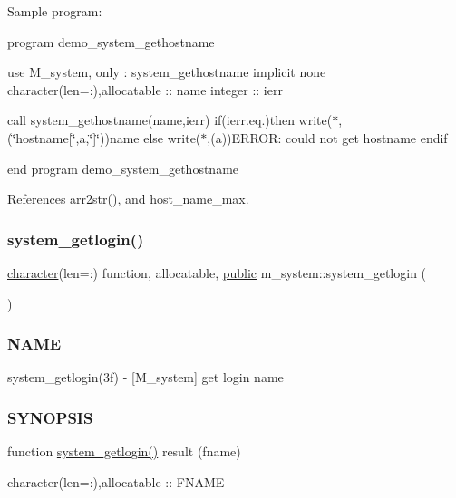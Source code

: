 Sample program\+:

program demo\+\_\+system\+\_\+gethostname

use M\+\_\+system, only \+: system\+\_\+gethostname implicit none character(len=\+:),allocatable \+:\+: name integer \+:\+: ierr

call system\+\_\+gethostname(name,ierr) if(ierr.\+eq.)then write($\ast$,\textquotesingle{}(\char`\"{}hostname\mbox{[}\char`\"{},a,\char`\"{}\mbox{]}\char`\"{})\textquotesingle{})name else write($\ast$,\textquotesingle{}(a)\textquotesingle{})\textquotesingle{}E\+R\+R\+OR\+: could not get hostname\textquotesingle{} endif

end program demo\+\_\+system\+\_\+gethostname 

References arr2str(), and host\+\_\+name\+\_\+max.

\mbox{\label{namespacem__system_a70f78645a1f130734005e190d469529d}} 
\subsubsection{\texorpdfstring{system\+\_\+getlogin()}{system\_getlogin()}}
{\footnotesize\ttfamily \hyperlink{option__stopwatch_83_8txt_abd4b21fbbd175834027b5224bfe97e66}{character}(len=\+:) function, allocatable, \hyperlink{M__stopwatch_83_8txt_a2f74811300c361e53b430611a7d1769f}{public} m\+\_\+system\+::system\+\_\+getlogin (\begin{DoxyParamCaption}{ }\end{DoxyParamCaption})}



\subsubsection*{N\+A\+ME}

system\+\_\+getlogin(3f) -\/ \mbox{[}M\+\_\+system\mbox{]} get login name 

\subsubsection*{S\+Y\+N\+O\+P\+S\+IS}

function \hyperlink{namespacem__system_a70f78645a1f130734005e190d469529d}{system\+\_\+getlogin()} result (fname)

character(len=\+:),allocatable \+:\+: F\+N\+A\+ME

